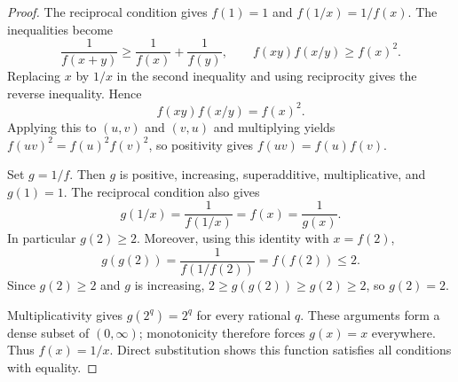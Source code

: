 
\begin{dlsummary}[title={\bfseries Solution 8. The Multiplicative Mirror},breakable]

\begin{proof}
The reciprocal condition gives $f(1)=1$ and $f(1/x)=1/f(x)$. The
inequalities become
\[
\frac1{f(x+y)}\geq\frac1{f(x)}+\frac1{f(y)},\qquad
f(xy)f(x/y)\geq f(x)^2. \tag{1}
\]
Replacing $x$ by $1/x$ in the second inequality and using reciprocity
gives the reverse inequality. Hence
\[
f(xy)f(x/y)=f(x)^2.
\]
Applying this to $(u,v)$ and $(v,u)$ and multiplying yields
$f(uv)^2=f(u)^2f(v)^2$, so positivity gives $f(uv)=f(u)f(v)$.

Set $g=1/f$. Then $g$ is positive, increasing, superadditive,
multiplicative, and $g(1)=1$. The reciprocal condition also gives
\[
g(1/x)=\frac1{f(1/x)}=f(x)=\frac1{g(x)}.
\]
In particular $g(2)\geq2$. Moreover, using this identity with
$x=f(2)$,
\[
g(g(2))=\frac1{f(1/f(2))}=f(f(2))\leq2.
\]
Since $g(2)\geq2$ and $g$ is increasing,
$2\geq g(g(2))\geq g(2)\geq2$, so $g(2)=2$.

Multiplicativity gives $g(2^q)=2^q$ for every rational $q$. These
arguments form a dense subset of $(0,\infty)$; monotonicity therefore
forces $g(x)=x$ everywhere. Thus $f(x)=1/x$. Direct substitution
shows this function satisfies all conditions with equality.
\end{proof}

\end{dlsummary}